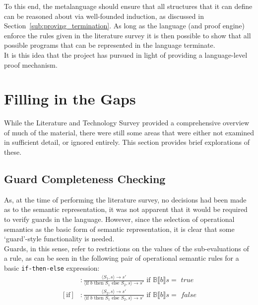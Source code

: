 To this end, the metalanguage should ensure that all structures that it can define can be reasoned about via well-founded induction, as discussed in Section~\ref{sub:proving_termination}. 
As long as the language (and proof engine) enforce the rules given in the literature survey it is then possible to show that all possible programs that can be represented in the language terminate.\\

It is this idea that the project has pursued in light of providing a language-level proof mechanism. 




\section{Filling in the Gaps} %
\label{sec:filling_in_the_gaps}
While the Literature and Technology Survey provided a comprehensive overview of much of the material, there were still some areas that were either not examined in sufficient detail, or ignored entirely. 
This section provides brief explorations of these.

\subsection{Guard Completeness Checking} %
\label{sub:guard_completeness_checking}
As, at the time of performing the literature survey, no decisions had been made as to the semantic representation, it was not apparent that it would be required to verify guards in the language.
However, since the selection of operational semantics as the basic form of semantic representation, it is clear that some `guard'-style functionality is needed. \\

Guards, in this sense, refer to restrictions on the values of the sub-evaluations of a rule, as can be seen in the following pair of operational semantic rules for a basic \texttt{if-then-else} expression:
\begin{align*}
    [\text{if}] &: \frac{\langle S_1, s \rangle \to s'}{\langle \text{if } b \text{ then } S_1 \text{ else } S_2, s\rangle \to s'} \text{ if } \mathbb{B}\llbracket b \rrbracket s = \textit{ true} \\
    [\text{if}] &: \frac{\langle S_2, s \rangle \to s'}{\langle \text{if } b \text{ then } S_1 \text{ else } S_2, s\rangle \to s'} \text{ if } \mathbb{B}\llbracket b \rrbracket s = \textit{ false}
\end{align*}

